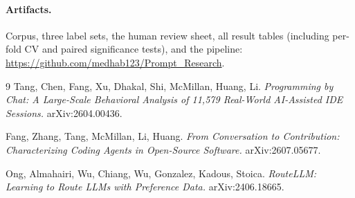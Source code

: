 \documentclass[10pt]{article}
\begin{document}
\paragraph{Artifacts.} Corpus, three label sets, the human review sheet, all
result tables (including per-fold CV and paired significance tests), and the
pipeline: \url{https://github.com/medhab123/Prompt_Research}.

\begin{thebibliography}{9}
\small
{}
Tang, Chen, Fang, Xu, Dhakal, Shi, McMillan, Huang, Li.
\emph{Programming by Chat: A Large-Scale Behavioral Analysis of 11,579
Real-World AI-Assisted IDE Sessions.} arXiv:2604.00436.

Fang, Zhang, Tang, McMillan, Li, Huang.
\emph{From Conversation to Contribution: Characterizing Coding Agents in
Open-Source Software.} arXiv:2607.05677.

Ong, Almahairi, Wu, Chiang, Wu, Gonzalez, Kadous, Stoica.
\emph{RouteLLM: Learning to Route LLMs with Preference Data.} arXiv:2406.18665.
\end{thebibliography}
\end{document}
